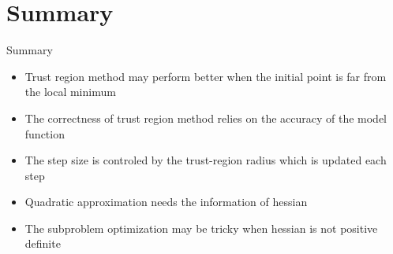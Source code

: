 \documentclass{beamer}
\begin{document}
\section{Summary}
\begin{frame}{Summary}
    \begin{itemize}
        \item Trust region method may perform better when the initial point is far from the local minimum
        \item The correctness of trust region method relies on the accuracy of the model function
        \item The step size is controled by the trust-region radius which is updated each step
        \item Quadratic approximation needs the information of hessian
        \item The subproblem optimization may be tricky when hessian is not positive definite
    \end{itemize}
\end{frame}
\end{document}
